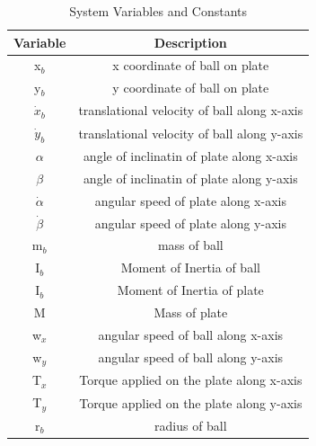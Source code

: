 \documentclass[conference]{IEEEtran}
\begin{document}
\begin{table}[h!]
\caption{System Variables and Constants}
\begin{center}
\begin{tabular}{| c | c |}
 \hline
 Variable & Description \\
\hline
x$_{b}$  & x coordinate of ball on plate \\
\hline
y$_{b}$  & y coordinate of ball on plate  \\
\hline
$\dot x_{b}$  & translational velocity of ball along x-axis  \\
\hline
$\dot y_{b}$  & translational velocity of ball along y-axis  \\
\hline
$\alpha$ & angle of inclinatin of plate along x-axis  \\
\hline
 $\beta$  &  angle of inclinatin of plate along y-axis\\
\hline
$\dot \alpha$ & angular speed of plate along x-axis  \\
\hline
 $\dot \beta$ & angular speed of plate along y-axis  \\
\hline
m$_{b}$  & mass of ball \\
\hline
 I$_{b}$  & Moment of Inertia of ball  \\
\hline
 I$_{b}$  & Moment of Inertia of plate  \\
\hline
 M  & Mass of plate \\
\hline
 w$_{x}$  & angular speed of ball along x-axis  \\
\hline
 w$_{y}$  & angular speed of ball along y-axis  \\
\hline
 T$_{x}$ & Torque applied on the plate along x-axis  \\
\hline
 T$_{y}$  & Torque applied on the plate along y-axis \\
\hline
 r$_{b}$ & radius of ball \\
\hline
\end{tabular}\label{table1}
\end{center}
\end{table}
\end{document}
